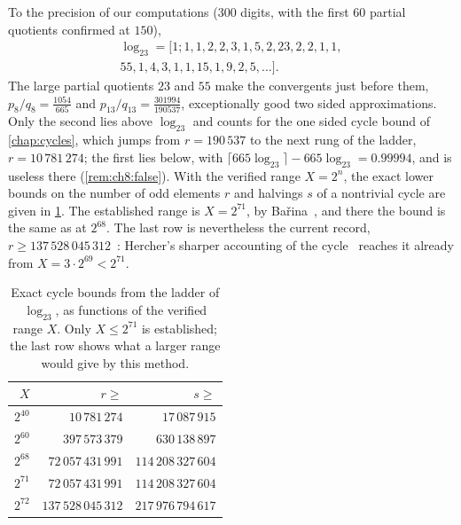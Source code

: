 To the precision of our computations ($300$ digits, with the first $60$ partial quotients confirmed at $150$),
\begin{multline*}
  \log_23=[1;1,1,2,2,3,1,5,2,23,2,2,1,1,\\
  55,1,4,3,1,1,15,1,9,2,5,\dots].
\end{multline*}
The large partial quotients $23$ and $55$ make the convergents just before
them, $p_8/q_8=\tfrac{1054}{665}$ and $p_{13}/q_{13}=\tfrac{301994}{190537}$, exceptionally good
two sided approximations. Only the second lies above $\log_23$ and counts for the one sided cycle bound of \cref{chap:cycles}, which jumps from $r=190\,537$ to the next rung of the ladder, $r=10\,781\,274$; the first lies below, with $\lceil665\log_23\rceil-665\log_23=0.99994$, and is useless there (\cref{rem:ch8:false}). With the verified range
$X=2^{n}$, the exact lower bounds on the number of odd elements $r$ and
halvings $s$ of a nontrivial cycle are given in \cref{tab:appA:cycles}.
The established range is $X=2^{71}$, by Ba\v{r}ina~\cite{barina2025}, and there the bound is the same as at $2^{68}$. The last row is nevertheless the current record, $r\ge137\,528\,045\,312$~\cite[\S6]{barina2025}: Hercher's sharper accounting of the cycle~\cite[Corollary~29]{hercher2023} reaches it already from $X=3\cdot2^{69}<2^{71}$.

\begin{table}[ht]
\centering\small
\caption{Exact cycle bounds from the ladder of $\log_23$, as functions of the
verified range $X$. Only $X\le2^{71}$ is established; the last row shows
what a larger range would give by this method.}
\label{tab:appA:cycles}
\begin{tabular}{@{}rrr@{}}
\toprule
$X$ & $r\ge$ & $s\ge$ \\
\midrule
$2^{40}$ & $10\,781\,274$ & $17\,087\,915$ \\
$2^{60}$ & $397\,573\,379$ & $630\,138\,897$ \\
$2^{68}$ & $72\,057\,431\,991$ & $114\,208\,327\,604$ \\
$2^{71}$ & $72\,057\,431\,991$ & $114\,208\,327\,604$ \\
$2^{72}$ & $137\,528\,045\,312$ & $217\,976\,794\,617$ \\
\bottomrule
\end{tabular}
\end{table}
